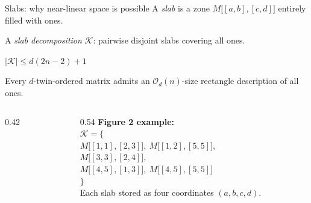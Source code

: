 \documentclass[aspectratio=169,11pt]{beamer}
\renewcommand{\leq}{\leqslant}
\newcommand{\Oh}{\mathcal{O}}
\newcommand{\fillslab}[6]{\fill[#1,opacity=0.58] ({#4-1},{#6-#3}) rectangle ({#5},{#6+1-#2});}
\newcommand{\drawslab}[6]{\draw[#1,very thick] ({#4-1},{#6-#3}) rectangle ({#5},{#6+1-#2});}
\begin{document}
\begin{frame}{Slabs: why near-linear space is possible}
A \emph{slab} is a zone $M\bigl[[a,b],[c,d]\bigr]$ entirely filled with ones.

A \emph{slab decomposition} $\mathcal{K}$: pairwise disjoint slabs covering all ones.

\medskip
\begin{alertblock}{}
$|\mathcal{K}| \leq d(2n-2)+1$
\end{alertblock}

{\small Every $d$-twin-ordered matrix admits an $\Oh_d(n)$-size rectangle description of all ones.}

\bigskip
\begin{columns}[T]
\begin{column}{0.42\textwidth}
\centering
{}
\end{column}
\begin{column}{0.54\textwidth}
{\small
\textbf{Figure 2 example:}\\[4pt]
$\mathcal{K}=\{$\\
\hspace*{1em}$M\bigl[[1,1],[2,3]\bigr],\ M\bigl[[1,2],[5,5]\bigr],$\\
\hspace*{1em}$M\bigl[[3,3],[2,4]\bigr],$\\
\hspace*{1em}$M\bigl[[4,5],[1,3]\bigr],\ M\bigl[[4,5],[5,5]\bigr]$\\
$\}$\\[4pt]

\medskip
Each slab stored as four coordinates $(a,b,c,d)$.
}
\end{column}
\end{columns}
\end{frame}
\end{document}
